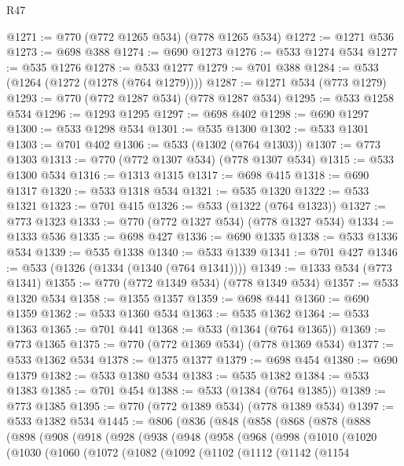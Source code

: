 \begin{lexlean}{R47}
\begin{coremodule}
@1271 := @770 (@772 @1265 @534) (@778 @1265 @534)
@1272 := @1271 @536
@1273 := @698 @388
@1274 := @690 @1273
@1276 := @533 @1274 @534
@1277 := @535 @1276
@1278 := @533 @1277
@1279 := @701 @388
@1284 := @533 (@1264 (@1272 (@1278 (@764 @1279))))
@1287 := @1271 @534 (@773 @1279)
@1293 := @770 (@772 @1287 @534) (@778 @1287 @534)
@1295 := @533 @1258 @534
@1296 := @1293 @1295
@1297 := @698 @402
@1298 := @690 @1297
@1300 := @533 @1298 @534
@1301 := @535 @1300
@1302 := @533 @1301
@1303 := @701 @402
@1306 := @533 (@1302 (@764 @1303))
@1307 := @773 @1303
@1313 := @770 (@772 @1307 @534) (@778 @1307 @534)
@1315 := @533 @1300 @534
@1316 := @1313 @1315
@1317 := @698 @415
@1318 := @690 @1317
@1320 := @533 @1318 @534
@1321 := @535 @1320
@1322 := @533 @1321
@1323 := @701 @415
@1326 := @533 (@1322 (@764 @1323))
@1327 := @773 @1323
@1333 := @770 (@772 @1327 @534) (@778 @1327 @534)
@1334 := @1333 @536
@1335 := @698 @427
@1336 := @690 @1335
@1338 := @533 @1336 @534
@1339 := @535 @1338
@1340 := @533 @1339
@1341 := @701 @427
@1346 := @533 (@1326 (@1334 (@1340 (@764 @1341))))
@1349 := @1333 @534 (@773 @1341)
@1355 := @770 (@772 @1349 @534) (@778 @1349 @534)
@1357 := @533 @1320 @534
@1358 := @1355 @1357
@1359 := @698 @441
@1360 := @690 @1359
@1362 := @533 @1360 @534
@1363 := @535 @1362
@1364 := @533 @1363
@1365 := @701 @441
@1368 := @533 (@1364 (@764 @1365))
@1369 := @773 @1365
@1375 := @770 (@772 @1369 @534) (@778 @1369 @534)
@1377 := @533 @1362 @534
@1378 := @1375 @1377
@1379 := @698 @454
@1380 := @690 @1379
@1382 := @533 @1380 @534
@1383 := @535 @1382
@1384 := @533 @1383
@1385 := @701 @454
@1388 := @533 (@1384 (@764 @1385))
@1389 := @773 @1385
@1395 := @770 (@772 @1389 @534) (@778 @1389 @534)
@1397 := @533 @1382 @534
@1445 := @806
    (@836
      (@848
        (@858
          (@868
            (@878
              (@888
                (@898
                  (@908
                    (@918
                      (@928
                        (@938
                          (@948
                            (@958
                              (@968
                                (@998
                                  (@1010
                                    (@1020
                                      (@1030
                                        (@1060
                                          (@1072
                                            (@1082
                                              (@1092
                                                (@1102
                                                  (@1112
                                                    (@1142
                                                      (@1154

\end{coremodule}
\end{lexlean}
